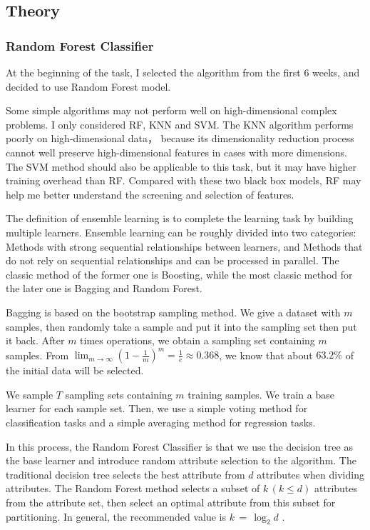 \subsection{Theory}

\subsubsection{Random Forest Classifier}

\indent

At the beginning of the task, I selected the algorithm from the first 6 weeks, and decided to use Random Forest model. 

Some simple algorithms may not perform well on high-dimensional complex problems. I only considered RF, KNN and SVM. The KNN algorithm performs poorly on high-dimensional data， because its dimensionality reduction process cannot well preserve high-dimensional features in cases with more dimensions. The SVM method should also be applicable to this task, but it may have higher training overhead than RF. Compared with these two black box models, RF may help me better understand the screening and selection of features.

The definition of ensemble learning is to complete the learning task by building multiple learners. Ensemble learning can be roughly divided into two categories: Methods with strong sequential relationships between learners, and Methods that do not rely on sequential relationships and can be processed in parallel. The classic method of the former one is Boosting, while the most classic method for the later one is Bagging and Random Forest.

Bagging is based on the bootstrap sampling method. We give a dataset with $m$ samples, then randomly take a sample and put it into the sampling set then put it back. After $m$ times operations, we obtain a sampling set containing $m$ samples. From $\lim_{m\rightarrow\infty}(1-\frac{1}{m})^m = \frac{1}{e} \approx 0.368$, we know that about $63.2\%$ of the initial data will be selected.

We sample $T$ sampling sets containing $m$ training samples. We train a base learner for each sample set. Then, we use a simple voting method for classification tasks and a simple averaging method for regression tasks.

In this process, the Random Forest Classifier is that we use the decision tree as the base learner and introduce random attribute selection to the algorithm. The traditional decision tree selects the best attribute from $d$ attributes when dividing attributes. The Random Forest method selects a subset of $k\,(k\leq d)$ attributes from the attribute set, then select an optimal attribute from this subset for partitioning. In general, the recommended value is $k\,=\,\log_{2}d$ \cite{breiman2001random}.

